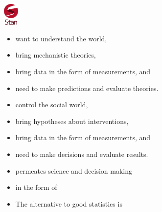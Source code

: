\documentclass[11pt]{report}
\begin{document}
\sf%
\mbox{ }
\\[12pt]
\spc{\LARGE\bfseries \color{MidnightBlue}{Taking Uncertainty Seriously}}
\\[4pt]
\\[36pt]
\noindent
\spc{\Large\bfseries \color{MidnightBlue}{Bob Carpenter}}
\\[2pt]
\vfill
\noindent
{} \hfill
\hfill
\includegraphics[width=0.3in]{img/new-logo.png}


\begin{itemize}
\item want to understand the world,
\item bring mechanistic theories,
\item bring data in the form of measurements, and
\item need to make predictions and evaluate theories.
\end{itemize}

\begin{itemize}
\item control the social world,
\item bring hypotheses about interventions,
\item bring data in the form of measurements, and
\item need to make decisions and evaluate results.
\end{itemize}

\begin{itemize}
\item permeates science and decision making
\item in the form of
\item The alternative to good statistics is
\end{itemize}
\end{document}
